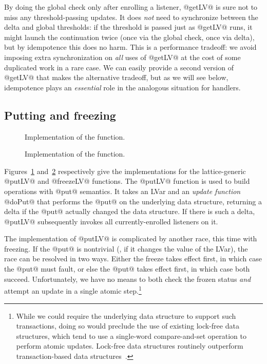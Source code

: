 By doing the global check only after enrolling a listener, @getLV@ is
sure not to miss any threshold-passing updates.  It does \emph{not}
need to synchronize between the delta and global thresholds: if the
threshold is passed just as @getLV@ runs, it might launch the
continuation twice (once via the global check, once via delta), but by
idempotence this does no harm.  This is a performance tradeoff: we
avoid imposing extra synchronization on \emph{all} uses of @getLV@ at
the cost of some duplicated work in a rare case.  We can easily
provide a second version of @getLV@ that makes the alternative
tradeoff, but as we will see below, idempotence plays an
\emph{essential} role in the analogous situation for handlers.

\subsection{Putting and freezing}


\begin{figure}
  \singlespacing
  
  \doublespacing
  \caption{Implementation of the 
    function.}\label{fig:implementation-putLV}
\end{figure}

\begin{figure}
  \singlespacing
  
  \doublespacing
  \caption{Implementation of the 
    function.}\label{fig:implementation-freezeLV}
\end{figure}

Figures~\ref{fig:implementation-putLV}
and~\ref{fig:implementation-freezeLV} respectively give the
implementations for the lattice-generic @putLV@ and @freezeLV@
functions.  The @putLV@ function is used to build operations with
@put@ semantics.  It takes an LVar and an \emph{update function}
@doPut@ that performs the @put@ on the underlying data structure,
returning a delta if the @put@ actually changed the data structure.
If there is such a delta, @putLV@ subsequently invokes all
currently-enrolled listeners on it.

The implementation of @putLV@ is complicated by another race, this
time with freezing.  If the @put@ is nontrivial (\ie, if it changes
the value of the LVar), the race can be resolved in two ways.  Either
the freeze takes effect first, in which case the @put@ must fault, or
else the @put@ takes effect first, in which case both succeed.
Unfortunately, we have no means to both check the frozen status
\emph{and} attempt an update in a single atomic step.\footnote{While
  we could require the underlying data structure to support such
  transactions, doing so would preclude the use of existing lock-free
  data structures, which tend to use a single-word compare-and-set
  operation to perform atomic updates.  Lock-free data structures
  routinely outperform transaction-based data
  structures~\cite{practical-lock-freedom}.}

